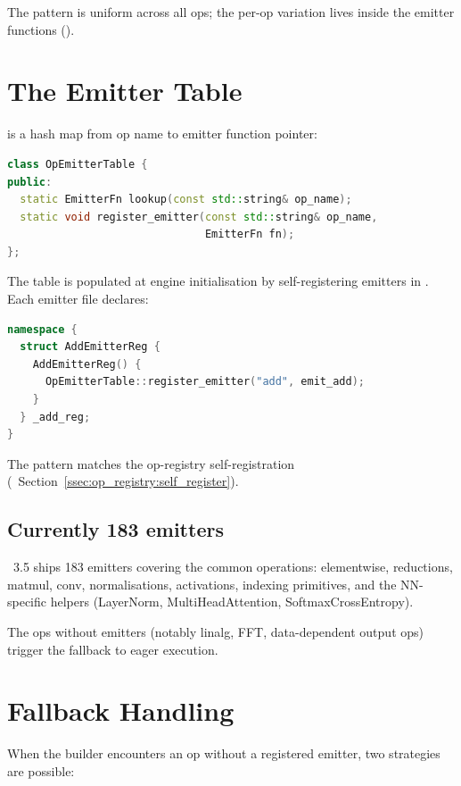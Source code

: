 The pattern is uniform across all ops; the per-op variation lives
inside the emitter functions ().

\section{The Emitter Table}
\label{sec:mps_builder:emitter_table}

 is a hash map from op name to emitter
function pointer:

\begin{lstlisting}[style=lucidcpp,language=C++]
class OpEmitterTable {
public:
  static EmitterFn lookup(const std::string& op_name);
  static void register_emitter(const std::string& op_name,
                               EmitterFn fn);
};
\end{lstlisting}

The table is populated at engine initialisation by
self-registering emitters in .
Each emitter file declares:

\begin{lstlisting}[style=lucidcpp,language=C++]
namespace {
  struct AddEmitterReg {
    AddEmitterReg() {
      OpEmitterTable::register_emitter("add", emit_add);
    }
  } _add_reg;
}
\end{lstlisting}

The pattern matches the op-registry self-registration
(~Section~\ref{ssec:op_registry:self_register}).

\subsection{Currently 183 emitters}
\label{ssec:mps_builder:emitter_count}

\Lucid\ 3.5 ships 183 emitters covering the common operations:
elementwise, reductions, matmul, conv, normalisations,
activations, indexing primitives, and the NN-specific helpers
(LayerNorm, MultiHeadAttention, SoftmaxCrossEntropy).

The ops without emitters (notably linalg, FFT, data-dependent
output ops) trigger the fallback to eager execution.

\section{Fallback Handling}
\label{sec:mps_builder:fallback}

When the builder encounters an op without a registered emitter,
two strategies are possible:

